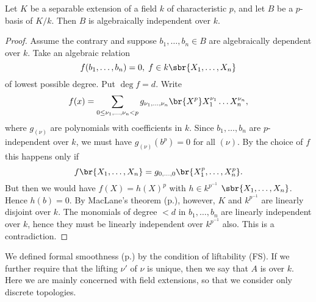 \documentclass[../main]{subfiles}
\begin{document}
\begin{theorem}
\label{thm:089}
    Let $K$ be a separable extension of a field $k$ of characteristic $p$, and let $B$ be a $p$-basis of $K/k$. Then $B$ is algebraically independent over $k$. 
\end{theorem}
\begin{proof}
    Assume the contrary and suppose $b_1, \dots, b_n \in B$ are algebraically dependent over $k$. Take an algebraic relation \[f(b_1, \dots, b_n) = 0, \; f\in k\sbr{X_1, \dots, X_n}\] of lowest possible degree. Put $\deg f = d$. Write 
    \[f(x) = \sum_{0\le \nu_1, \dots, \nu_n < p} g_{\nu_1, \dots, \nu_n}\br{X^p} X_1^{\nu_1}\dots X_n^{\nu_n},\]
    where $g_{(\nu)}$ are polynomials with coefficients in $k$. Since $b_1, \dots, b_n$ are \linebreak$p$-independent over $k$, we must have $g_{(\nu)}(b^p)=0$ for all $(\nu)$. By the choice of $f$ this happens only if
    \[f\br{X_1, \dots, X_n} = g_{0, \dots, 0}\br{X_1^p, \dots, X_n^p}.\]
    But then we would have $f(X) = h(X)^p$ with $h \in k^{p^{-1}}$ $\sbr{X_1, \dots, X_n}$. Hence \newline $h(b) = 0$. By MacLane's theorem (p.\pageref{exe:27.01}), however, $K$ and $k^{p^{-1}}$ are linearly disjoint over $k$. The monomials of degree $< d$ in $b_1, \dots, b_n$ are linearly independent over $k$, hence they must be linearly independent over $k^{p^{-1}}$ also. This is a contradiction. 
\end{proof}

\newparagraph
We defined formal smoothness (p.\pageref{def:28.formally smooth}) by the condition of liftability (FS). If we further require that the lifting $\nu'$ of $\nu$ is unique, then we say that $A$ is  over $k$. Here we are mainly concerned with field extensions, so that we consider only discrete topologies.
\end{document}
